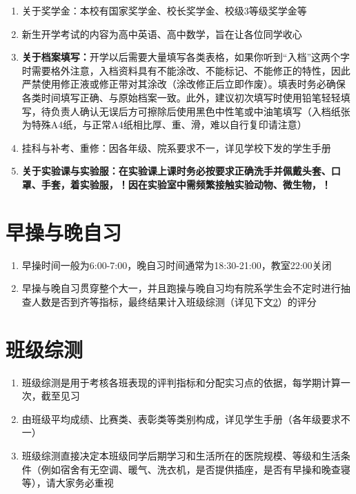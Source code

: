\begin{enumerate}
      \item 关于奖学金\footnotemark：本校有国家奖学金、校长奖学金、校级3等级奖学金等
      \item 新生开学考试\footnotemark 的内容为高中英语、高中数学，旨在让各位同学收心
      \item \textbf{关于档案填写：}开学以后需要大量填写各类表格，如果你听到“入档”这两个字时需要格外注意，入档资料具有不能涂改、不能标记、不能修正的特性，因此严禁使用修正液或修正带对其涂改（涂改修正后立即作废）。填表时务必确保各类时间填写正确、与原始档案一致。此外，建议初次填写时使用铅笔轻轻填写，待负责人确认无误后方可擦除后使用黑色中性笔或中油笔填写（入档纸张为特殊A4纸，与正常A4纸相比厚、重、滑，难以自行复印请注意）
      \item 挂科与补考、重修：因各年级、院系要求不一，详见学校下发的学生手册
      \item \textbf{关于实验课与实验服：在实验课上课时务必按要求正确洗手并佩戴头套、口罩、手套，着实验服，！因在实验室中需频繁接触实验动物、微生物，！}
            \label{schoolbag}
\end{enumerate}

\section[早操与晚自习]{早操与晚自习}
\begin{enumerate}
      \item 早操时间一般为6:00-7:00，晚自习时间通常为18:30-21:00，教室22:00关闭
      \item 早操与晚自习贯穿整个大一\footnotemark，并且跑操与晚自习均有院系学生会不定时进行抽查人数是否到齐等指标，最终结果计入班级综测（详见下文\uline{\ref{class_evaluation}}）的评分
\end{enumerate}

\section[班级综测]{班级综测}
\label{class_evaluation}
\begin{enumerate}
      \item 班级综测是用于考核各班表现的评判指标和分配实习点的依据\footnotemark，每学期计算一次，截至见习
      \item 由班级平均成绩、比赛类、表彰类等类别构成，详见学生手册（各年级要求不一）
      \item 班级综测直接决定本班级同学后期学习和生活所在的医院规模、等级和生活条件（例如宿舍有无空调、暖气、洗衣机，是否提供插座，是否有早操和晚查寝\footnotemark 等），请大家务必重视
\end{enumerate}

